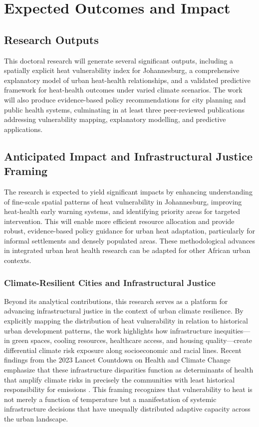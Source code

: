 \section{Expected Outcomes and Impact}

\subsection{Research Outputs}
This doctoral research will generate several significant outputs, including a spatially explicit heat vulnerability index for Johannesburg, a comprehensive explanatory model of urban heat-health relationships, and a validated predictive framework for heat-health outcomes under varied climate scenarios. The work will also produce evidence-based policy recommendations for city planning and public health systems, culminating in at least three peer-reviewed publications addressing vulnerability mapping, explanatory modelling, and predictive applications.

\subsection{Anticipated Impact and Infrastructural Justice Framing}
The research is expected to yield significant impacts by enhancing understanding of fine-scale spatial patterns of heat vulnerability in Johannesburg, improving heat-health early warning systems, and identifying priority areas for targeted intervention. This will enable more efficient resource allocation and provide robust, evidence-based policy guidance for urban heat adaptation, particularly for informal settlements and densely populated areas. These methodological advances in integrated urban heat health research can be adapted for other African urban contexts.

\subsubsection{Climate-Resilient Cities and Infrastructural Justice}
Beyond its analytical contributions, this research serves as a platform for advancing infrastructural justice in the context of urban climate resilience. By explicitly mapping the distribution of heat vulnerability in relation to historical urban development patterns, the work highlights how infrastructure inequities—in green spaces, cooling resources, healthcare access, and housing quality—create differential climate risk exposure along socioeconomic and racial lines. Recent findings from the 2023 Lancet Countdown on Health and Climate Change emphasize that these infrastructure disparities function as determinants of health that amplify climate risks in precisely the communities with least historical responsibility for emissions \citep{Romanello2023}. This framing recognizes that vulnerability to heat is not merely a function of temperature but a manifestation of systemic infrastructure decisions that have unequally distributed adaptive capacity across the urban landscape.

